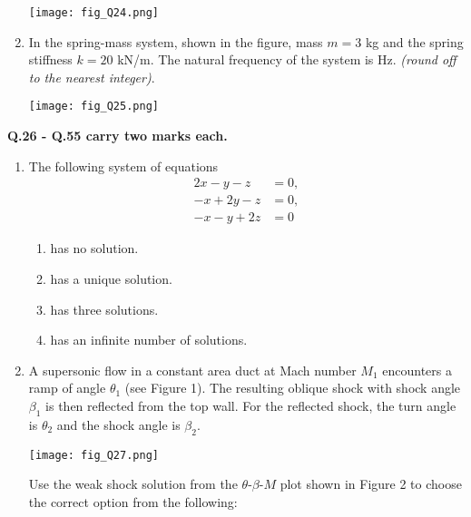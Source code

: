 \documentclass[12pt]{article}
\begin{document}
\begin{enumerate}[label=Q.\arabic*]
		\begin{center}
			\texttt{[image: fig\_Q24.png]}
		\end{center}
	\item In the spring-mass system, shown in the figure, mass $m = 3$ kg and the spring stiffness $k = 20$ kN/m. The natural frequency of the system is \underline{\hspace{2cm}} Hz. \textit{(round off to the nearest integer)}.

		\begin{center}
			\texttt{[image: fig\_Q25.png]}
		\end{center}
\end{enumerate}
\newpage
\noindent\textbf{Q.26 - Q.55 carry two marks each.}
\begin{enumerate}[label=Q.\arabic*, start=26]

	\item The following system of equations  
		\[
			\begin{aligned}
				2x - y - z &= 0, \\
				-x + 2y - z &= 0, \\
				-x - y + 2z &= 0
			\end{aligned}
		\]  

		\begin{multicols}{2}
			\begin{enumerate}[label=(\Alph*)]
				\item has no solution.
				\item has a unique solution.
				\item has three solutions.
				\item has an infinite number of solutions.
			\end{enumerate}
		\end{multicols}

	\item A supersonic flow in a constant area duct at Mach number $M_1$ encounters a ramp of angle $\theta_1$ (see Figure 1). The resulting oblique shock with shock angle $\beta_1$ is then reflected from the top wall. For the reflected shock, the turn angle is $\theta_2$ and the shock angle is $\beta_2$.  

		\begin{center}
			\texttt{[image: fig\_Q27.png]} %
		\end{center}

		Use the weak shock solution from the $\theta$-$\beta$-$M$ plot shown in Figure 2 to choose the correct option from the following:


\end{enumerate}
\end{document}
